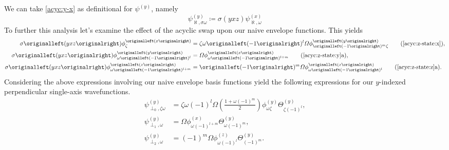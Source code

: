 We can take \eqref{acyc:y-x} as definitional for $\psi^{\left(y\right)}$, namely
\begin{equation}
\psi_{\aleph,\sigma\omega}^{\left(y\right)}
  \coloneqq
    \sigma\left(yxz\right)\psi_{\aleph,\omega}^{\left(x\right)}
\end{equation}
To further this analysis let's examine the effect of the acyclic swap upon our
naive envelope functions. This yields
\begin{align}
\sigma\left(yxz\right)
\phi_{ \zeta }^{\left(x\right)}
  & =
    \zeta\omega\left(-1\right)^{l}\Omega
    \phi_{ \left(-1\right)^{m}\zeta }^{\left(y\right)}
\tag{\ref{acyc:z-state:x}}
,\\
\sigma\left(yxz\right)
\phi_{ \omega\left(-1\right)^{l} }^{\left(y\right)}
  & =
    \Omega
    \phi_{ \omega\left(-1\right)^{l+m} }^{\left(x\right)}
\tag{\ref{acyc:z-state:y}a}
,\\
\sigma\left(yxz\right)
\phi_{ \omega\left(-1\right)^{l+m} }^{\left(z\right)}
  & =
    \left(-1\right)^{m}\Omega
    \phi_{ \omega\left(-1\right)^{l} }^{\left(z\right)}
\tag{\ref{acyc:z-state:z}a}
.
\end{align}
Considering the above expressions involving our naive envelope basis functions
yield the following expressions for our $y$-indexed perpendicular single-axis wavefunctions.
\begin{align}
\psi^{\left(y\right)}_{\perp_{0},\zeta\omega}
  &=
    \zeta\omega\left(-1\right)^{l}\Omega
    \left(\frac{1+\omega\left(-1\right)^{m}}{2}\right)
    \phi_{ \omega\zeta }^{\left(y\right)}
    \Theta_{ \zeta\left(-1\right)^{l} }^{\left(y\right)}
,\\
\psi^{\left(y\right)}_{\perp_{1},\omega}
  &=
    \Omega
    \phi_{ \omega\left(-1\right)^{l+m} }^{\left(x\right)}
    \Theta_{ \omega\left(-1\right)^{m} }^{\left(y\right)}
,\\
\psi^{\left(y\right)}_{\perp_{2},\omega}
  &=
    \left(-1\right)^{m}\Omega
    \phi_{ \omega\left(-1\right)^{l} }^{\left(z\right)}
    \Theta_{ \left(-1\right)^{m} }^{\left(y\right)}
.
\end{align}

